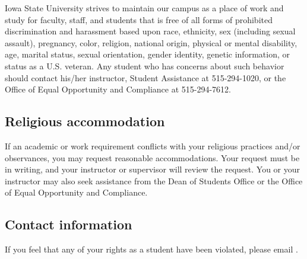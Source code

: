 \documentclass[nofonts,nols]{tufte-handout}
\begin{document}
Iowa State University strives to maintain our campus as a place of
work and study for faculty, staff, and students that is free of all
forms of prohibited discrimination and harassment based upon race,
ethnicity, sex (including sexual assault), pregnancy, color, religion,
national origin, physical or mental disability, age, marital status,
sexual orientation, gender identity, genetic information, or status as
a U.S. veteran. Any student who has concerns about such behavior
should contact his/her instructor, Student Assistance at 515-294-1020,
or the Office of Equal Opportunity and Compliance at 515-294-7612.

\subsection*{Religious accommodation}

If an academic or work requirement conflicts with your religious
practices and/or observances, you may request reasonable
accommodations. Your request must be in writing, and your instructor
or supervisor will review the request.  You or your instructor may
also seek assistance from the Dean of Students Office or the Office of
Equal Opportunity and Compliance.

\subsection*{Contact information}

If you feel that any of your rights as a student have been violated,
please email .

\newpage



\end{document}
